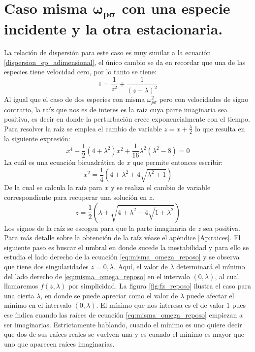 \documentclass[../tesis_main_file.tex]{subfiles}
\begin{document}
\section{Caso misma $\boldsymbol{\omega_{p\sigma}}$ con una especie incidente y la otra estacionaria.}
La relación de dispersión para este caso es muy similar a la ecuación \ref{dispersion_ep_adimensional}, el único cambio se da en recordar que una de las especies tiene velocidad cero, por lo tanto se tiene:
\begin{equation}
\label{eq:misma_omega_reposo}
1 = \frac{1}{z^2} + \frac{1}{(z-\lambda)^2}
\end{equation}
Al igual que el caso de dos especies con misma $\omega_{p\sigma}^2$ pero con velocidades de signo contrario, la raíz que nos es de interes es la raíz cuya parte imaginaria sea positiva, es decir en donde la perturbación crece exponencialmente con el tiempo. Para resolver la raíz se emplea el cambio de variable $z=x+\frac{\lambda}{2}$ lo que resulta en la siguiente expresión:
\begin{equation}
\label{eq:reducida_misma_reposo}
x^4 - \frac{1}{2}(4 + \lambda^2)x^2 + \frac{1}{16}\lambda^2 (\lambda^2 -8)=0
\end{equation}
La cuál es una ecuación bicuadrática de $x$ que permite entonces escribir:
\begin{equation}
\label{eq:bicuad_misma_reposo}
x^2 = \frac{1}{4}(4 + \lambda^2 \pm 4\sqrt{ \lambda^2 +1})
\end{equation}
De la cual se calcula la raíz para $x$ y se realiza el cambio de variable correspondiente para recuperar una solución en $z$.
\begin{equation}
\label{eq:solucion_misma_reposo}
z = \frac{1}{2}\left(\lambda + \sqrt{4 + \lambda ^2 - 4 \sqrt{1 + \lambda ^2}} \right)
\end{equation}
Los signos de la raíz se escogen para que la parte imaginaria de $z$ sea positiva. Para más detalle sobre la obtención de la raíz véase el apéndice \ref{Ap:raices}.
El siguiente paso es buscar el umbral en donde sucede la inestabilidad y para ello se estudia el lado derecho de la ecuación \ref{eq:misma_omega_reposo} y se observa que tiene dos singularidades $z=0,\lambda$. Aquí, el valor de $\lambda$ determinará el mínimo del lado derecho de \ref{eq:misma_omega_reposo} en el intervalo $(0,\lambda)$, al cual llamaremos $f(z,\lambda)$ por simplicidad. La figura \ref{fig:fz_reposo} ilustra el caso para una cierta $\lambda$, en donde se puede apreciar como el valor de $\lambda$ puede afectar el mínimo en el intervalo $(0,\lambda)$. El mínimo que nos interesa es el de valor $1$ pues ese índica cuando las raíces de ecuación \ref{eq:misma_omega_reposo} empiezan a ser imaginarias. Estrictamente hablando, cuando el mínimo es uno quiere decir que dos de sus raíces reales se vuelven una y es cuando el mínimo es mayor que uno que aparecen raíces imaginarias.
\end{document}

